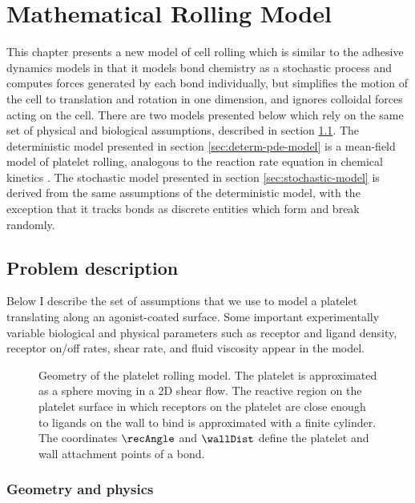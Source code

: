 
\chapter{Mathematical Rolling Model}
\label{cha:model}

This chapter presents a new model of cell rolling which is similar to
the adhesive dynamics models in that it models bond chemistry as a
stochastic process and computes forces generated by each bond
individually, but simplifies the motion of the cell to translation and
rotation in one dimension, and ignores colloidal forces acting on the
cell. There are two models presented below which rely on the same set
of physical and biological assumptions, described in section
\ref{sec:problem-description}. The deterministic model presented in
section \ref{sec:determ-pde-model} is a mean-field model of platelet
rolling, analogous to the reaction rate equation in chemical kinetics
\cite{Gillespie2007}. The stochastic model presented in section
\ref{sec:stochastic-model} is derived from the same assumptions of the
deterministic model, with the exception that it tracks bonds as
discrete entities which form and break randomly.

\section{Problem description}
\label{sec:problem-description}

Below I describe the set of assumptions that we use to model a
platelet translating along an agonist-coated surface. Some important
experimentally variable biological and physical parameters such as
receptor and ligand density, receptor on/off rates, shear rate, and
fluid viscosity appear in the model.

\begin{figure}
  \centering
  
  \caption[Geometry of the platelet rolling model]{Geometry of the
    platelet rolling model. The platelet is approximated as a sphere
    moving in a 2D shear flow. The reactive region on the platelet
    surface in which receptors on the platelet are close enough to
    ligands on the wall to bind is approximated with a finite
    cylinder. The coordinates $\recAngle$ and $\wallDist$ define the
    platelet and wall attachment points of a bond.}
  \label{fig:model-geometry}
\end{figure}

\subsection{Geometry and physics}
\label{sec:geometry-physics}


